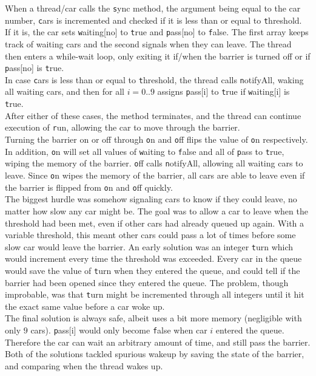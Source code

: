 When a thread/car calls the {\texttt sync} method, the argument being equal to the car number, {\texttt cars} is incremented and checked if it is less than or equal to {\texttt threshold}.\\
If it is, the car sets {\texttt waiting[no]} to {\texttt true} and {\texttt pass[no]} to {\texttt false}. The first array keeps track of waiting cars and the second signals when they can leave. The thread then enters a while-wait loop, only exiting it if/when the barrier is turned off or if {\texttt pass[no]} is {\texttt true}.\\
In case {\texttt cars} is less than or equal to {\texttt threshold}, the thread calls {\texttt notifyAll}, waking all waiting cars, and then for all $i=0..9$ assigns {\texttt pass[i]} to {\texttt true} if {\texttt waiting[i]} is {\texttt true}.\\
After either of these cases, the method terminates, and the thread can continue execution of {\texttt run}, allowing the car to move through the barrier.\\

Turning the barrier on or off through {\texttt on} and {\texttt off} flips the value of {\texttt on} respectively. In addition, {\texttt on} will set all values of {\texttt waiting} to {\texttt false} and all of {\texttt pass} to {\texttt true}, wiping the memory of the barrier. {\texttt off} calls {\texttt notifyAll}, allowing all waiting cars to leave. Since {\texttt on} wipes the memory of the barrier, all cars are able to leave even if the barrier is flipped from {\texttt on} and {\texttt off} quickly.\\

The biggest hurdle was somehow signaling cars to know if they could leave, no matter how slow any car might be. The goal was to allow a car to leave when the threshold had been met, even if other cars had already queued up again. With a variable threshold, this meant other cars could pass a lot of times before some slow car would leave the barrier. An early solution was an integer {\texttt turn} which would increment every time the threshold was exceeded. Every car in the queue would save the value of {\texttt turn} when they entered the queue, and could tell if the barrier had been opened since they entered the queue. The problem, though improbable, was that {\texttt turn} might be incremented through all integers until it hit the exact same value before a car woke up.\\

The final solution is always safe, albeit uses a bit more memory (negligible with only $9$ cars). {\texttt pass[i]} would only become {\texttt false} when car $i$ entered the queue. Therefore the car can wait an arbitrary amount of time, and still pass the barrier. Both of the solutions tackled spurious wakeup by saving the state of the barrier, and comparing when the thread wakes up.\\

